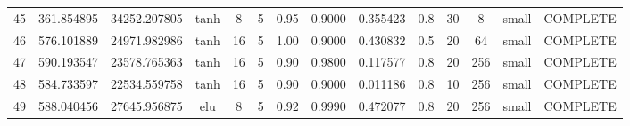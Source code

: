 \begin{longtable}{cccccccccccccc}
                       45 &                 361.854895 &                       34252.207805 &            tanh &           8 &              5 &        0.95 & 0.9000 &       0.355423 &             0.8 &                 30 &        8 &     small & COMPLETE \\
                       46 &                 576.101889 &                       24971.982986 &            tanh &          16 &              5 &        1.00 & 0.9000 &       0.430832 &             0.5 &                 20 &       64 &     small & COMPLETE \\
                       47 &                 590.193547 &                       23578.765363 &            tanh &          16 &              5 &        0.90 & 0.9800 &       0.117577 &             0.8 &                 20 &      256 &     small & COMPLETE \\
                       48 &                 584.733597 &                       22534.559758 &            tanh &          16 &              5 &        0.90 & 0.9000 &       0.011186 &             0.8 &                 10 &      256 &     small & COMPLETE \\
                       49 &                 588.040456 &                       27645.956875 &             elu &           8 &              5 &        0.92 & 0.9990 &       0.472077 &             0.8 &                 20 &      256 &     small & COMPLETE \\
\end{longtable}
